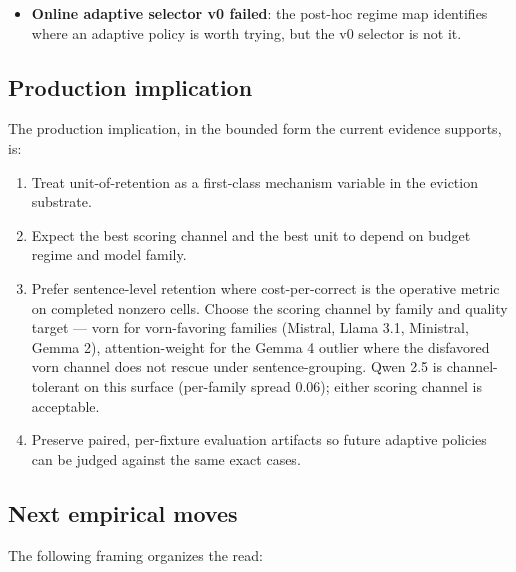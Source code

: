 \documentclass[10pt]{article}
\providecommand{\tightlist}{%
 \setlength{\itemsep}{0pt}\setlength{\parskip}{0pt}}
\begin{document}
\begin{itemize}
\tightlist
\item
 \textbf{Online adaptive selector v0 failed}: the post-hoc regime map
 identifies where an adaptive policy is worth trying, but the v0
 selector is not it.
\end{itemize}

\subsection{Production implication}\label{69-production-implication}

The production implication, in the bounded form the current evidence
supports, is:

\begin{enumerate}
\def\labelenumi{\arabic{enumi}.}
\tightlist
\item
 Treat unit-of-retention as a first-class mechanism variable in the
 eviction substrate.
\item
 Expect the best scoring channel and the best unit to depend on budget
 regime and model family.
\item
 Prefer sentence-level retention where cost-per-correct is the
 operative metric on completed nonzero cells. Choose the scoring
 channel by family and quality target --- vorn for vorn-favoring
 families (Mistral, Llama 3.1, Ministral, Gemma 2), attention-weight
 for the Gemma 4 outlier where the disfavored vorn channel does not
 rescue under sentence-grouping. Qwen 2.5 is channel-tolerant on this
 surface (per-family spread 0.06); either scoring channel is
 acceptable.
\item
 Preserve paired, per-fixture evaluation artifacts so future adaptive
 policies can be judged against the same exact cases.
\end{enumerate}

\subsection{Next empirical moves}\label{610-next-empirical-moves}

The following framing organizes the read:
\end{document}
